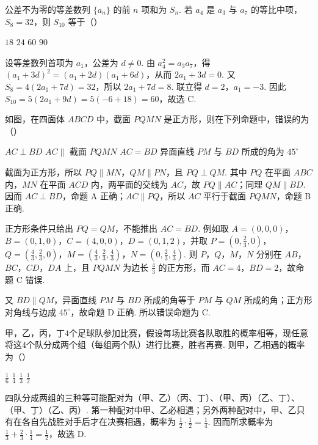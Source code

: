 \begin{problem}
公差不为零的等差数列 \(\{a_{n}\}\) 的前 \(n\) 项和为 \(S_{n}\). 若 \(a_{4}\) 是 \(a_{3}\) 与 \(a_{7}\) 的等比中项，\(S_{8} = 32\)，则 \(S_{10}\) 等于（\quad）

\choices
    {\(18\)}
    {\(24\)}
    {\(60\)}
    {\(90\)}
\begin{solution}
设等差数列首项为 \(a_{1}\)，公差为 \(d\neq0\). 由 \(a_{4}^{2}=a_{3}a_{7}\)，得
\((a_{1}+3d)^{2}=(a_{1}+2d)(a_{1}+6d)\)，从而 \(2a_{1}+3d=0\). 又
\(S_{8}=4(2a_{1}+7d)=32\)，所以 \(2a_{1}+7d=8\). 联立得 \(d=2\)，\(a_{1}=-3\). 因此
\(S_{10}=5(2a_{1}+9d)=5(-6+18)=60\)，故选 C.
\end{solution}
\end{problem}

\begin{problem}
如图，在四面体 \(ABCD\) 中，截面 \(PQMN\) 是正方形，则在下列命题中，错误的为（\quad）


\choices
    {\(AC \perp BD\)}
    {\(AC \parallel\) 截面 \(PQMN\)}
    {\(AC = BD\)}
    {异面直线 \(PM\) 与 \(BD\) 所成的角为 \(45^{\circ}\)}
\begin{solution}
截面为正方形，所以 \(PQ\parallel MN\)，\(QM\parallel PN\)，且 \(PQ\perp QM\). 其中 \(PQ\) 在平面 \(ABC\) 内，\(MN\) 在平面 \(ACD\) 内，两平面的交线为 \(AC\)，故 \(PQ\parallel AC\)；同理 \(QM\parallel BD\). 因而 \(AC\perp BD\)，命题 A 正确；\(AC\parallel PQ\)，所以 \(AC\) 平行于截面 \(PQMN\)，命题 B 正确.

正方形条件只给出 \(PQ=QM\)，不能推出 \(AC=BD\). 例如取 \(A=(0,0,0)\)，\(B=(0,1,0)\)，\(C=(4,0,0)\)，\(D=(0,1,2)\)，并取 \(P=(0,\frac23,0)\)，\(Q=(\frac43,\frac23,0)\)，\(M=(\frac43,\frac23,\frac43)\)，\(N=(0,\frac23,\frac43)\). 则 \(P\)，\(Q\)，\(M\)，\(N\) 分别在 \(AB\)，\(BC\)，\(CD\)，\(DA\) 上，且 \(PQMN\) 为边长 \(\frac43\) 的正方形，而 \(AC=4\)，\(BD=2\)，故命题 C 错误.

又 \(BD\parallel QM\)，异面直线 \(PM\) 与 \(BD\) 所成的角等于 \(PM\) 与 \(QM\) 所成的角；正方形对角线与边成 \(45^{\circ}\)，故命题 D 正确. 所以错误命题为 C.
\end{solution}
\end{problem}

\begin{problem}
甲，乙，丙，丁\(4\)个足球队参加比赛，假设每场比赛各队取胜的概率相等，现任意将这\(4\)个队分成两个组（每组两个队）进行比赛，胜者再赛. 则甲，乙相遇的概率为（\quad）

\choices
    {\(\frac{1}{6}\)}
    {\( \frac{1}{4} \)}
    {\( \frac{1}{3} \)}
    {\( \frac{1}{2} \)}
\begin{solution}
四队分成两组的三种等可能配对为（甲、乙）（丙、丁）、（甲、丙）（乙、丁）、（甲、丁）（乙、丙）. 第一种配对中甲、乙必相遇；另外两种配对中，甲、乙只有在各自先战胜对手后才在决赛相遇，概率为 \(\frac12\cdot\frac12=\frac14\). 因而所求概率为
\(\frac13+\frac23\cdot\frac14=\frac12\)，故选 D.
\end{solution}
\end{problem}


